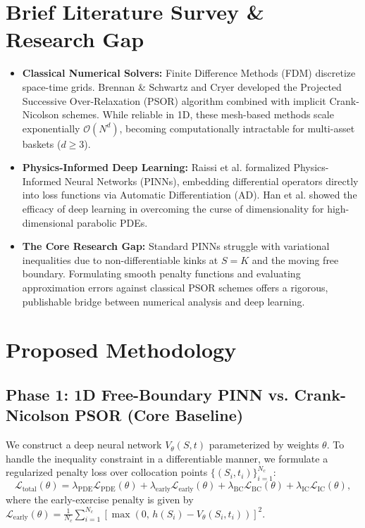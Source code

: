 ﻿\documentclass[10.5pt,a4paper]{article}
\begin{document}
\vspace{-0.3em}
\section{Brief Literature Survey \& Research Gap}
\begin{itemize}[leftmargin=*, itemsep=0.05em, topsep=0.05em]
    \item \textbf{Classical Numerical Solvers:} Finite Difference Methods (FDM) discretize space-time grids. Brennan \& Schwartz \cite{brennan1977} and Cryer \cite{cryer1971} developed the Projected Successive Over-Relaxation (PSOR) algorithm combined with implicit Crank-Nicolson schemes. While reliable in 1D, these mesh-based methods scale exponentially $\mathcal{O}(N^d)$, becoming computationally intractable for multi-asset baskets ($d \ge 3$).
    \item \textbf{Physics-Informed Deep Learning:} Raissi et al. \cite{raissi2019} formalized Physics-Informed Neural Networks (PINNs), embedding differential operators directly into loss functions via Automatic Differentiation (AD). Han et al. \cite{han2018} showed the efficacy of deep learning in overcoming the curse of dimensionality for high-dimensional parabolic PDEs.
    \item \textbf{The Core Research Gap:} Standard PINNs struggle with variational inequalities due to non-differentiable kinks at $S = K$ and the moving free boundary. Formulating smooth penalty functions and evaluating approximation errors against classical PSOR schemes offers a rigorous, publishable bridge between numerical analysis and deep learning.
\end{itemize}

\vspace{-0.3em}
\section{Proposed Methodology}

\subsection{Phase 1: 1D Free-Boundary PINN vs. Crank-Nicolson PSOR (Core Baseline)}
We construct a deep neural network $V_\theta(S, t)$ parameterized by weights $\theta$. To handle the inequality constraint in a differentiable manner, we formulate a regularized penalty loss over collocation points $\{ (S_i, t_i) \}_{i=1}^{N_c}$:
\begin{equation}
\mathcal{L}_{\text{total}}(\theta) = \lambda_{\text{PDE}} \mathcal{L}_{\text{PDE}}(\theta) + \lambda_{\text{early}} \mathcal{L}_{\text{early}}(\theta) + \lambda_{\text{BC}} \mathcal{L}_{\text{BC}}(\theta) + \lambda_{\text{IC}} \mathcal{L}_{\text{IC}}(\theta),
\end{equation}
where the early-exercise penalty is given by $\mathcal{L}_{\text{early}}(\theta) = \frac{1}{N_c} \sum_{i=1}^{N_c} \left[ \max\left(0, \, h(S_i) - V_\theta(S_i, t_i)\right) \right]^2$.
\end{document}
